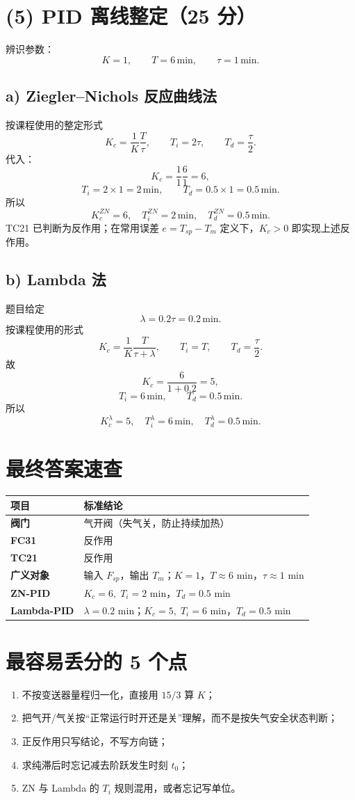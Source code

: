 \documentclass[UTF8,a4paper,11pt]{ctexart}
\begin{document}
\section*{(5) PID 离线整定（25 分）}
辨识参数：
\[
K=1,\qquad T=6\,\mathrm{min},\qquad \tau=1\,\mathrm{min}.
\]

\subsection*{a) Ziegler--Nichols 反应曲线法}
按课程使用的整定形式
\[
K_c=\frac{1}{K}\frac{T}{\tau},\qquad
T_i=2\tau,\qquad
T_d=\frac{\tau}{2}.
\]
代入：
\[
K_c=\frac{1}{1}\frac{6}{1}=6,
\]
\[
T_i=2\times1=2\,\mathrm{min},\qquad
T_d=0.5\times1=0.5\,\mathrm{min}.
\]
所以
\[
\boxed{K_c^{ZN}=6,\quad T_i^{ZN}=2\,\mathrm{min},\quad T_d^{ZN}=0.5\,\mathrm{min}}.
\]
TC21 已判断为反作用；在常用误差 $e=T_{sp}-T_m$ 定义下，$K_c>0$ 即实现上述反作用。

\subsection*{b) Lambda 法}
题目给定
\[
\lambda=0.2\tau=0.2\,\mathrm{min}.
\]
按课程使用的形式
\[
K_c=\frac{1}{K}\frac{T}{\tau+\lambda},\qquad
T_i=T,\qquad
T_d=\frac{\tau}{2}.
\]
故
\[
K_c=\frac{6}{1+0.2}=5,
\]
\[
T_i=6\,\mathrm{min},\qquad T_d=0.5\,\mathrm{min}.
\]
所以
\[
\boxed{K_c^{\lambda}=5,\quad T_i^{\lambda}=6\,\mathrm{min},\quad T_d^{\lambda}=0.5\,\mathrm{min}}.
\]

\section*{最终答案速查}
\begin{center}
\renewcommand{\arraystretch}{1.35}
\begin{tabular}{>{\bfseries}p{35mm}p{105mm}}
\toprule
项目 & 标准结论 \\
\midrule
阀门 & 气开阀（失气关，防止持续加热） \\
FC31 & 反作用 \\
TC21 & 反作用 \\
广义对象 & 输入 $F_{sp}$，输出 $T_m$；$K=1$，$T\approx6$ min，$\tau\approx1$ min \\
ZN-PID & $K_c=6,\;T_i=2$ min，$T_d=0.5$ min \\
Lambda-PID & $\lambda=0.2$ min；$K_c=5,\;T_i=6$ min，$T_d=0.5$ min \\
\bottomrule
\end{tabular}
\end{center}

\section*{最容易丢分的 5 个点}
\begin{enumerate}[leftmargin=2em,itemsep=2pt]
\item 不按变送器量程归一化，直接用 $15/3$ 算 $K$；
\item 把气开/气关按“正常运行时开还是关”理解，而不是按失气安全状态判断；
\item 正反作用只写结论，不写方向链；
\item 求纯滞后时忘记减去阶跃发生时刻 $t_0$；
\item ZN 与 Lambda 的 $T_i$ 规则混用，或者忘记写单位。
\end{enumerate}
\end{document}
